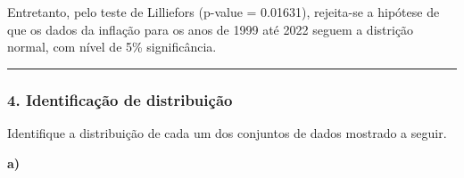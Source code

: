 \documentclass[
  letterpaper,
  DIV=11,
  numbers=noendperiod]{scrartcl}
\begin{document}
Entretanto, pelo teste de Lilliefors (p-value = 0.01631), rejeita-se a
hipótese de que os dados da inflação para os anos de 1999 até 2022
seguem a distrição normal, com nível de 5\% significância.

\begin{center}\rule{0.5\linewidth}{0.5pt}\end{center}

\hypertarget{identificauxe7uxe3o-de-distribuiuxe7uxe3o-1}{%
\subsubsection{4. Identificação de
distribuição}\label{identificauxe7uxe3o-de-distribuiuxe7uxe3o-1}}

Identifique a distribuição de cada um dos conjuntos de dados mostrado a
seguir.

\textbf{a)}
\end{document}
